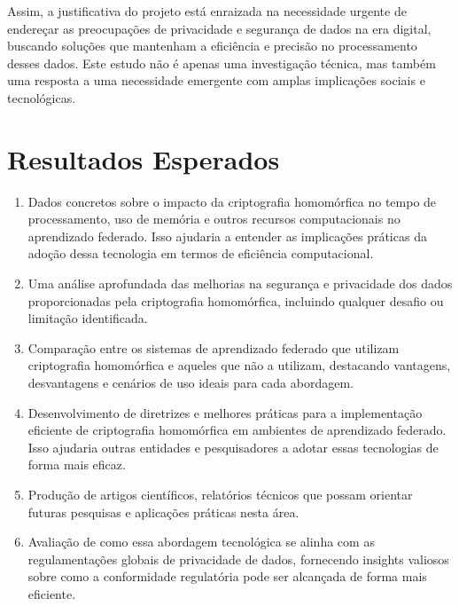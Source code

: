 \documentclass{article}
\begin{document}
Assim, a justificativa do projeto está enraizada na necessidade urgente de endereçar as preocupações de privacidade e segurança de dados na era digital, buscando soluções que mantenham a eficiência e precisão no processamento desses dados. Este estudo não é apenas uma investigação técnica, mas também uma resposta a uma necessidade emergente com amplas implicações sociais e tecnológicas.


\section{Resultados Esperados}


\begin{enumerate}
    \item Dados concretos sobre o impacto da criptografia homomórfica no tempo de processamento, uso de memória e outros recursos computacionais no aprendizado federado. Isso ajudaria a entender as implicações práticas da adoção dessa tecnologia em termos de eficiência computacional.
    
    \item Uma análise aprofundada das melhorias na segurança e privacidade dos dados proporcionadas pela criptografia homomórfica, incluindo qualquer desafio ou limitação identificada.
    
    \item Comparação entre os sistemas de aprendizado federado que utilizam criptografia homomórfica e aqueles que não a utilizam, destacando vantagens, desvantagens e cenários de uso ideais para cada abordagem.
    
    \item Desenvolvimento de diretrizes e melhores práticas para a implementação eficiente de criptografia homomórfica em ambientes de aprendizado federado. Isso ajudaria outras entidades e pesquisadores a adotar essas tecnologias de forma mais eficaz.

    \item Produção de artigos científicos, relatórios técnicos que possam orientar futuras pesquisas e aplicações práticas nesta área.
    
    \item  Avaliação de como essa abordagem tecnológica se alinha com as regulamentações globais de privacidade de dados, fornecendo insights valiosos sobre como a conformidade regulatória pode ser alcançada de forma mais eficiente.

    
\end{enumerate}


 

%
%
\end{document}
